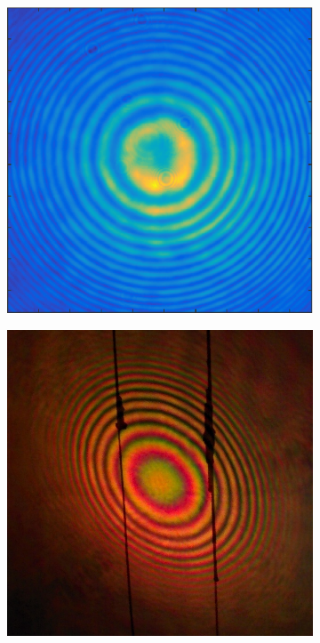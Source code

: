 \documentclass[12pt,a4paper,twoside]{article}
\begin{document}
\begin{figure}
	\centering
	\begin{subfigure}[b]{0.45\textwidth}
        \includegraphics[width=\textwidth]{photos/generated_2}
        \caption{}
        \label{fig_interference}
    \end{subfigure}
    \hspace{0.05\textwidth}
	\begin{subfigure}[b]{0.45\textwidth}
        \includegraphics[width=\textwidth]{photos/interference_TiS}

\end{subfigure}
\end{figure}
\end{document}
